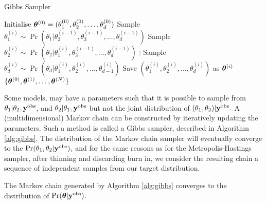 \begin{algorithm}[htbp]
    \caption{Gibbs Sampler}
    \label{alg:gibbs}
    \begin{algorithmic}[1]
        \State Initialise
        $\bm{\theta}^{(0)} = (\theta_1^{(0)}, \theta_2^{(0)}, \dots, \theta_d^{(0)})$
        \State Sample
        $\theta_1^{(i)}
            \sim \Pr(
            \theta_1
            | \theta_2^{(i-1)}, \theta_3^{(i-1)}, \dots, \theta_d^{(i-1)}
            )$
        \State Sample
        $\theta_2^{(i)}
            \sim \Pr(
            \theta_2
            | \theta_1^{(i)}, \theta_3^{(i-1)}, \dots, \theta_d^{(i-1)})$
        \State $\vdots$
        \State Sample
        $\theta_d^{(i)}
            \sim \Pr(
            \theta_d
            | \theta_1^{(i)}, \theta_2^{(i)}, \dots, \theta_{d-1}^{(i)})$
        \State Save $(\theta_1^{(i)}, \theta_2^{(i)}, \dots, \theta_d^{(i)})$
        as $\bm{\theta}^{(i)}$
        \EndFor
        \State \Return $\{\bm{\theta}^{(0)}, \bm{\theta}^{(1)}, \dots, \bm{\theta}^{(N)}\}$
    \end{algorithmic}
\end{algorithm}

Some models, may have a parameters such that it is possible
to sample from $\theta_1 | \theta_2, \mathbf{y}^{\mathrm{obs}}$, and
$\theta_2 | \theta_1, \mathbf{y}^{\mathrm{obs}}$ but not the joint distribution of
$(\theta_1, \theta_2)| \mathbf{y}^{\mathrm{obs}}.$ A (multidimensional) Markov chain can be
constructed by iteratively updating the parameters. Such a method is called
a Gibbs sampler, described in
Algorithm \ref{alg:gibbs}. The distribution of the Markov chain
sampler will eventually converge to the
$\Pr(\theta_1, \theta_2 | \mathbf{y}^{\mathrm{obs}}),$ and for the same reasons as for
the Metropolis-Hastings
sampler, after thinning and discarding burn in, we consider the resulting
chain a sequence of independent samples from our target distribution.

\begin{theorem}
    The Markov chain generated by Algorithm \ref{alg:gibbs}
    converges to the distribution of $\Pr(\bm{\theta}|\mathbf{y}^{\mathrm{obs}}).$
\end{theorem}

